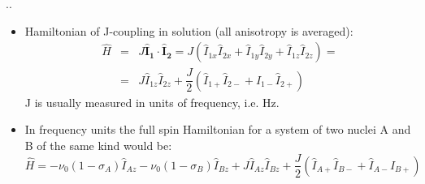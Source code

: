 \documentclass[handout]{beamer}
\begin{document}
\begin{frame}{\thesection.\thesubsection. \insertsubsection}
	\begin{itemize}[<+>]
		\item 
			Hamiltonian of J-coupling in solution (all anisotropy is averaged):
			\begin{equation}
			\begin{array}{lcl}
			\hat{H}  &=& J \bm{\hat{I}_{1}} \cdot  \bm{\hat{I}_{2}} = J ( \hat{I}_{1x} \hat{I}_{2x} + \hat{I}_{1y} \hat{I}_{2y} + \hat{I}_{1z} \hat{I}_{2z}   ) =	\\
			&=&  J  \hat{I}_{1z} \hat{I}_{2z} +\dfrac{J}{2} (\hat{I}_{1+} \hat{I}_{2-} + \hat{I}_{1-} \hat{I}_{2+} )  	  
			\end{array}
			\end{equation}
			J is usually measured in units of frequency, i.e. Hz. 
			
		\item
		In frequency units the full spin Hamiltonian for a system of two nuclei A and B of the same kind would be:
		\begin{equation}
		\hat{H} = -\nu_0(1 - \sigma_A) \hat{I}_{Az} - \nu_0(1- \sigma_B) \hat{I}_{Bz} + J  \hat{I}_{Az} \hat{I}_{Bz} +\dfrac{J}{2} (\hat{I}_{A+} \hat{I}_{B-} + \hat{I}_{A-} \hat{I}_{B+} ) 
		\end{equation}
		
	\end{itemize}
		
	
\end{frame}
\end{document}
